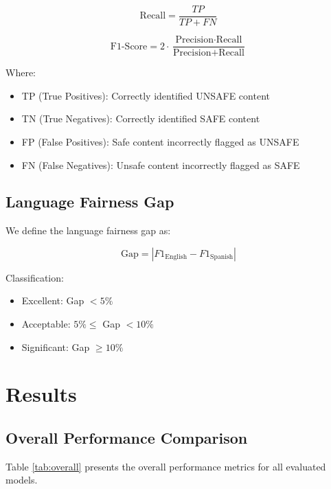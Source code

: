 \documentclass[11pt,a4paper]{article}
\begin{document}
\begin{equation}
\text{Recall} = \frac{TP}{TP + FN}
\end{equation}

\begin{equation}
\text{F1-Score} = 2 \cdot \frac{\text{Precision} \cdot \text{Recall}}{\text{Precision} + \text{Recall}}
\end{equation}

Where:
\begin{itemize}
    \item TP (True Positives): Correctly identified UNSAFE content
    \item TN (True Negatives): Correctly identified SAFE content
    \item FP (False Positives): Safe content incorrectly flagged as UNSAFE
    \item FN (False Negatives): Unsafe content incorrectly flagged as SAFE
\end{itemize}

\subsection{Language Fairness Gap}
We define the language fairness gap as:

\begin{equation}
\text{Gap} = |F1_{\text{English}} - F1_{\text{Spanish}}|
\end{equation}

Classification:
\begin{itemize}
    \item Excellent: Gap $< 5\%$
    \item Acceptable: $5\% \leq$ Gap $< 10\%$
    \item Significant: Gap $\geq 10\%$
\end{itemize}

\section{Results}

\subsection{Overall Performance Comparison}

Table \ref{tab:overall} presents the overall performance metrics for all evaluated models.
\end{document}
